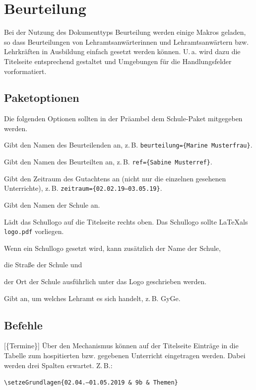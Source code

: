 \section{Beurteilung}
\label{typ:beurteilung}
Bei der Nutzung des Dokumenttyps Beurteilung werden einige Makros geladen, so dass Beurteilungen von
Lehramtsanwärterinnen und Lehramtsanwärtern bzw. Lehrkräften in Ausbildung einfach gesetzt werden
können. U.\,a. wird dazu die Titelseite entsprechend gestaltet und Umgebungen für die
Handlungsfelder vorformatiert.

\subsection{Paketoptionen}
Die folgenden Optionen sollten in der Präambel dem Schule-Paket mitgegeben werden.
\begin{options}
   Gibt den Namen des Beurteilenden an, z.\,B. \texttt{beurteilung=\{Marine Musterfrau\}}.

   Gibt den Namen des Beurteilten an, z.\,B. \texttt{ref=\{Sabine Musterref\}}.

	 Gibt den Zeitraum des Gutachtens an (nicht nur die einzelnen gesehenen Unterrichte), z.\,B.
\texttt{zeitraum=\{02.02.19--03.05.19\}}.

	Gibt den Namen der Schule an.

  Lädt das Schullogo auf die Titelseite rechts oben. Das Schullogo sollte \LaTeX als
\texttt{logo.pdf} vorliegen.

  Wenn ein Schullogo gesetzt wird, kann zusätzlich der Name der Schule,

  die Straße der Schule und

  der Ort der Schule ausführlich unter das Logo geschrieben werden.

  Gibt an, um welches Lehramt es sich handelt, z.\,B. GyGe.
\end{options}

 \subsection{Befehle}
 \begin{commands}
     [\{Termine\}]
				 Über den Mechanismus können auf der Titelseite Einträge in die Tabelle zum hospitierten
bzw. gegebenen Unterricht eingetragen werden. Dabei werden drei Spalten erwartet. Z.\,B.:

			\texttt{\textbackslash setzeGrundlagen\{02.04.--01.05.2019 \& 9b \& Themen\}}
 \end{commands}
 

